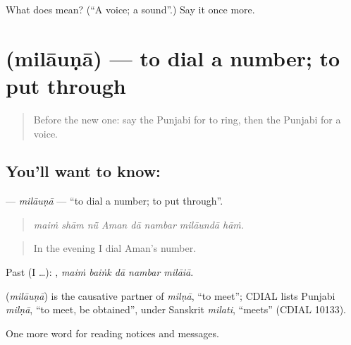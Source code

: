 \begin{tcolorbox}[breakable,colback=teal!4,colframe=teal!35!black,title={Before you move on}]
What does  mean? (\textquotedblleft{}A voice; a sound\textquotedblright{}.) Say it once more.
\end{tcolorbox}
\section[\texorpdfstring{\pa{ਮਿਲਾਉਣਾ} (milāuṇā)}{ਮਿਲਾਉਣਾ (milāuṇā)}]{ (milāuṇā) — to dial a number; to put through}

\label{lesson:PA-C259-milauna}



\begin{quote}
Before the new one: say the Punjabi for to ring, then the Punjabi for a voice.
\end{quote}

\subsection*{You'll want to know: }
\textbf{} — \emph{milāuṇā} — \textquotedblleft{}to dial a number; to put through\textquotedblright{}.

\begin{quote}
       
\end{quote}

\begin{quote}
\emph{maiṁ shām nū̃ Aman dā nambar milāundā hāṁ.}
\end{quote}

\begin{quote}
In the evening I dial Aman's number.
\end{quote}

Past (I …):     , \emph{maiṁ baiṅk dā nambar milāiā}.

\begin{cousinweb}
\textbf{} (\emph{milāuṇā}) is the causative partner of \emph{milṇā}, \textquotedblleft{}to meet\textquotedblright{}; CDIAL lists Punjabi \emph{milṇā}, \textquotedblleft{}to meet, be obtained\textquotedblright{}, under Sanskrit \emph{milati}, \textquotedblleft{}meets\textquotedblright{} (CDIAL 10133).
\end{cousinweb}

\begin{grammarlens}[title={What you've built}]
One more word for reading notices and messages.
\end{grammarlens}

